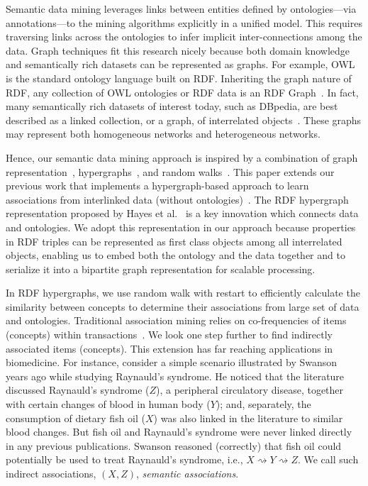 Semantic data mining leverages links between entities defined by ontologies---via annotations---to the mining algorithms explicitly in a unified model. This requires traversing links across the ontologies to infer implicit inter-connections among the data. Graph techniques fit this research nicely because both domain knowledge and semantically rich datasets can be represented as graphs. For example, OWL~\cite{OWL} is the standard ontology language built on RDF. Inheriting the graph nature of RDF, any collection of OWL ontologies or RDF data is an RDF Graph~\cite{GraphModelRDF}. In fact, many semantically rich datasets of interest today, such as DBpedia,  are best described as a linked collection, or a graph, of interrelated objects~\cite{LinkMiningGetoor}. These graphs may represent both homogeneous networks and heterogeneous networks.

Hence, our semantic data mining approach is inspired by a combination of graph representation~\cite{CheinMugnier08}, hypergraphs~\cite{Zhou06learningwith}, and random walks~\cite{Fouss06random-walkcomputation, Zhou:2009:GCB:1687627.1687709}. This paper extends our previous work that implements a hypergraph-based approach to learn associations from interlinked data (without ontologies)~\cite{LiuEtal11}. The RDF hypergraph representation proposed by Hayes et al.~\cite{GraphModelRDF} is a key innovation which connects data and ontologies. We adopt this representation in our approach because properties in RDF triples can be represented as first class objects among all interrelated objects, enabling us to embed both the ontology and the data together and to serialize it into a bipartite graph representation for scalable processing.

In RDF hypergraphs, we use random walk with restart to efficiently calculate the similarity between concepts to determine their associations from large set of data and ontologies. Traditional association mining relies on co-frequencies of items (concepts) within transactions~\cite{Agrawal94}. We look one step further to find indirectly associated items (concepts). This extension has far reaching applications in biomedicine. For instance, consider a simple scenario illustrated by Swanson~\cite{swanson87} years ago while studying Raynauld's syndrome. He noticed that the literature discussed Raynauld's syndrome ($Z$), a peripheral circulatory disease, together with certain changes of blood in human body ($Y$); and, separately, the consumption of dietary fish oil ($X$) was also linked in the literature to similar blood changes.  But fish oil and Raynauld's syndrome were never linked directly in any previous publications.  Swanson reasoned (correctly) that fish oil could potentially be used to treat Raynauld's syndrome, i.e., $X\rightsquigarrow Y \rightsquigarrow Z$. We call such indirect associations, $(X,Z)$, \emph{semantic associations}.

